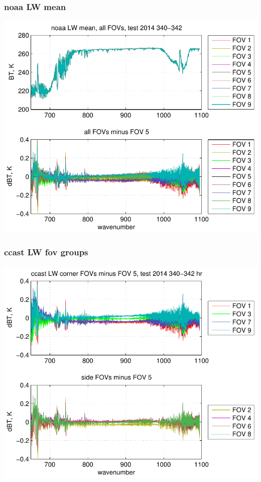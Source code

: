 \documentclass[11pt]{beamer}
\begin{document}
\begin{frame}
\frametitle{noaa LW mean}

\begin{center}
  \includegraphics[scale=0.7]{figures/noaa_LW_avg_2014_340-342.pdf}
\end{center}

\end{frame}
\begin{frame}
\frametitle{ccast LW fov groups}

\begin{center}
  \includegraphics[scale=0.7]{figures/ccast_LW_dif_2014_340-342_hr.pdf}
\end{center}

\end{frame}
\end{document}
